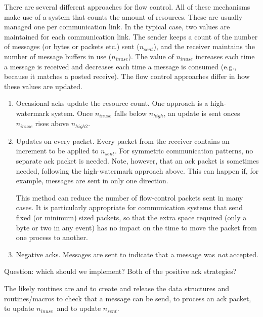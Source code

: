 \documentclass{article}
\begin{document}
\makeussubscript
There are several different approaches for flow control.  All of these
mechanisms make use of a system that counts the amount of resources.
These are usually managed one per communication link.  In the typical
case, two values are maintained for each communication link.  The
sender keeps a count of the number of messages (or bytes or packets
etc.) sent ($n_{sent}$), and the receiver maintains the number of
message buffers 
in use ($n_{inuse}$).  The value of $n_{inuse}$ increases each time a
message is received and decreases each time a message is consumed
(e.g., because it matches a posted receive). 
The flow control approaches differ in how these values are updated. 

\begin{enumerate}
\item Occasional acks update the resource count.  One approach is a
high-watermark system.  Once $n_{inuse}$ falls below $n_{high}$, an
update is sent onces $n_{inuse}$ rises above $n_{high2}$. 

\item Updates on every packet.  Every packet from the receiver
contains an increment to be applied to $n_{sent}$.  For symmetric
communication patterns, no separate ack packet is needed.  Note,
however, that an ack packet is sometimes needed, following the
high-watermark approach above.  This can happen if, for example,
messages are sent in only one direction.  

This method can reduce the number of flow-control packets sent in many
cases.  It is particularly appropriate for communication systems that
send fixed (or minimum) sized packets, so that the extra space
required (only a byte or two in any event) has no impact on the time
to move the packet from one process to another.  

\item Negative acks.  Messages are sent to indicate that a message was
\emph{not} accepted. 

\end{enumerate}
\makeustext

Question: which should we implement?  Both of the positive ack
strategies? 

The likely routines are
 and  to create and
release the data structures and routines/macros 
to check that a message can be send,  to process
an ack packet,  to update 
\makeussubscript$n_{inuse}$\makeustext\ and
 to update \makeussubscript$n_{sent}$\makeustext.
\end{document}
